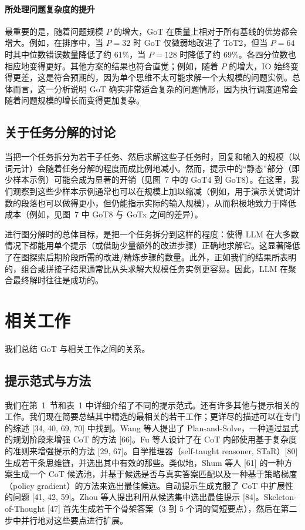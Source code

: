 \documentclass[11pt,UTF8,fontset=fandol]{ctexart}
\begin{document}
\paragraph{所处理问题复杂度的提升} 最重要的是，随着问题规模 $P$ 的增大，GoT 在质量上相对于所有基线的优势都会增大。例如，在排序中，当 $P = 32$ 时 GoT 仅微弱地改进了 ToT2，但当 $P = 64$ 时其中位数错误数量降低了约 61\%，当 $P = 128$ 时降低了约 69\%。各四分位数也相应地变得更好。其他方案的结果也符合直觉；例如，随着 $P$ 的增大，IO 始终变得更差，这是符合预期的，因为单个思维不太可能求解一个大规模的问题实例。总体而言，这一分析说明 GoT 确实非常适合复杂的问题情形，因为执行调度通常会随着问题规模的增长而变得更加复杂。

\subsection{关于任务分解的讨论}

当把一个任务拆分为若干子任务、然后求解这些子任务时，回复和输入的规模（以词元计）会随着任务分解的程度而成比例地减小。然而，提示中的“静态”部分（即少样本示例）可能会成为显著的开销（见图~7 中的 GoT4 到 GoT8）。在这里，我们观察到这些少样本示例通常也可以在规模上加以缩减（例如，用于演示关键词计数的段落也可以做得更小，但仍能指示实际的输入规模），从而积极地致力于降低成本（例如，见图~7 中 GoT8 与 GoTx 之间的差异）。

进行图分解时的总体目标，是把一个任务拆分到这样的程度：使得 LLM 在大多数情况下都能用单个提示（或借助少量额外的改进步骤）正确地求解它。这显著降低了在图探索后期阶段所需的改进/精炼步骤的数量。此外，正如我们的结果所表明的，组合或拼接子结果通常比从头求解大规模任务实例更容易。因此，LLM 在聚合最终解时往往是成功的。

\section{相关工作}

我们总结 GoT 与相关工作之间的关系。

\subsection{提示范式与方法}

我们在第~1~节和表~1 中详细介绍了不同的提示范式。还有许多其他与提示相关的工作。我们现在简要总结其中精选的最相关的若干工作；更详尽的描述可以在专门的综述 [34, 40, 69, 70] 中找到。Wang 等人提出了 Plan-and-Solve，一种通过显式的规划阶段来增强 CoT 的方法 [66]。Fu 等人设计了在 CoT 内部使用基于复杂度的准则来增强提示的方法 [29, 67]。自学推理器（self-taught reasoner, STaR）[80] 生成若干条思维链，并选出其中有效的那些。类似地，Shum 等人 [61] 的一种方案生成一个 CoT 候选池，并基于候选是否与真实答案匹配以及一种基于策略梯度（policy gradient）的方法来选出最佳候选。自动提示生成克服了 CoT 中扩展性的问题 [41, 42, 59]。Zhou 等人提出利用从候选集中选出最佳提示 [84]。Skeleton-of-Thought [47] 首先生成若干个骨架答案（3 到 5 个词的简短要点），然后在第二步中并行地对这些要点进行扩展。
\end{document}
